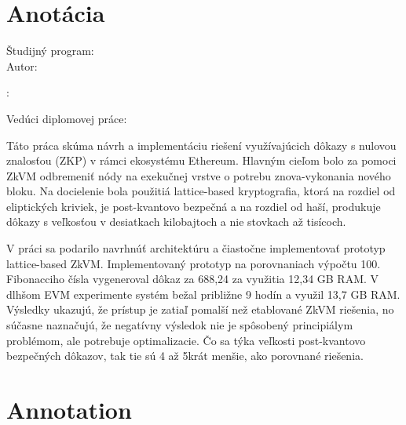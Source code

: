 \thispagestyle{empty}

\vspace*{\fill}

\section*{Anotácia}

\begin{minipage}[t]{1\columnwidth}
	\FIITuniversitySK

	\FIITfacultySK

	Študijný program: \FIITstudyProgramSK\\

	Autor: \FIITauthor

	\FIITthesisSK: \FIITtitleSK

	Vedúci diplomovej práce: \FIITsupervisor

	\FIITdateSK
\end{minipage}

\bigskip{}

Táto práca skúma návrh a implementáciu riešení využívajúcich
dôkazy s nulovou znalosťou (ZKP) v rámci ekosystému Ethereum.
Hlavným cieľom bolo za pomoci ZkVM odbremeniť nódy na exekučnej
vrstve o potrebu znova-vykonania nového bloku. Na docielenie
bola použitiá lattice-based kryptografia, ktorá na rozdiel od eliptických
kriviek, je post-kvantovo bezpečná a na rozdiel od haší, produkuje dôkazy
s veľkosťou v desiatkach kilobajtoch a nie stovkach až tisícoch.

V práci sa podarilo navrhnúť architektúru a čiastočne implementovať
prototyp lattice-based ZkVM. Implementovaný prototyp na porovnaniach výpočtu 100. Fibonacciho čísla
vygeneroval dôkaz za 688,24 za využitia 12,34 GB RAM. V dlhšom EVM experimente
systém bežal približne 9 hodín a využil 13,7 GB RAM. Výsledky ukazujú, že
prístup je zatiaľ pomalší než etablované ZkVM riešenia, no súčasne naznačujú,
že negatívny výsledok nie je spôsobený principiálym problémom, ale
potrebuje optimalizacie. Čo sa týka veľkosti post-kvantovo bezpečných dôkazov,
tak tie sú 4 až 5krát menšie, ako porovnané riešenia.

\newpage{}\thispagestyle{empty}\medskip{}

\thispagestyle{empty}

\vspace*{\fill}

\section*{Annotation}

